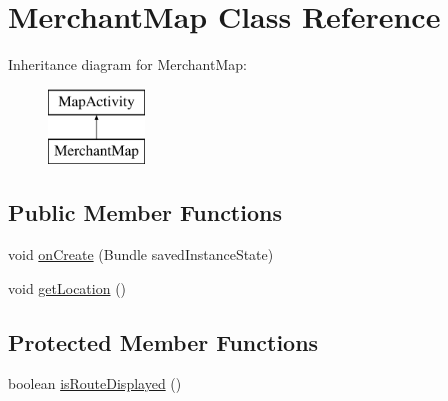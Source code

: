 \hypertarget{classapp_1_1localization_1_1_merchant_map}{\section{Merchant\-Map Class Reference}
\label{classapp_1_1localization_1_1_merchant_map}
}
Inheritance diagram for Merchant\-Map\-:\begin{figure}[H]
\begin{center}
\leavevmode
\includegraphics[height=2.000000cm]{classapp_1_1localization_1_1_merchant_map}
\end{center}
\end{figure}
\subsection*{Public Member Functions}
\begin{DoxyCompactItemize}
\item 
void \hyperlink{classapp_1_1localization_1_1_merchant_map_a85e87cb5ced88dff7c8173ecc4f636d1}{on\-Create} (Bundle saved\-Instance\-State)
\item 
void \hyperlink{classapp_1_1localization_1_1_merchant_map_a8d6a2ed4f43e4f93ddd846c3ed28b383}{get\-Location} ()
\end{DoxyCompactItemize}
\subsection*{Protected Member Functions}
\begin{DoxyCompactItemize}
\item 
boolean \hyperlink{classapp_1_1localization_1_1_merchant_map_a294a4986d39cff22365b36850bb2a0ca}{is\-Route\-Displayed} ()
\end{DoxyCompactItemize}


